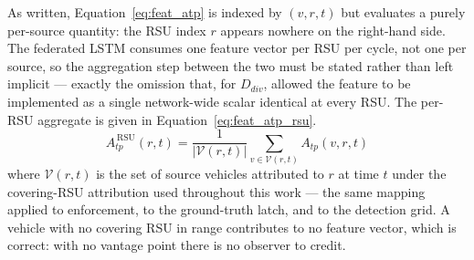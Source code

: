 \documentclass[12pt, a4paper]{report}
\begin{document}
As written, Equation~\eqref{eq:feat_atp} is indexed by $(v,r,t)$ but evaluates
a purely per-source quantity: the \ac{RSU} index $r$ appears nowhere on the
right-hand side. The federated \ac{LSTM} consumes one feature vector per
\ac{RSU} per cycle, not one per source, so the aggregation step between the two
must be stated rather than left implicit --- exactly the omission that, for
$D_{div}$, allowed the feature to be implemented as a single network-wide
scalar identical at every \ac{RSU}. The per-\ac{RSU} aggregate is given in
Equation~\eqref{eq:feat_atp_rsu}.
\begin{equation}
A_{tp}^{\,\mathrm{RSU}}(r,t) =
\frac{1}{|\mathcal{V}(r,t)|}
\sum_{v \in \mathcal{V}(r,t)} A_{tp}(v,r,t)
\label{eq:feat_atp_rsu}
\end{equation}
where $\mathcal{V}(r,t)$ is the set of source vehicles attributed to $r$ at
time $t$ under the covering-\ac{RSU} attribution used throughout this work ---
the same mapping applied to enforcement, to the ground-truth latch, and to the
detection grid. A vehicle with no covering \ac{RSU} in range contributes to no
feature vector, which is correct: with no vantage point there is no observer to
credit.
\end{document}

